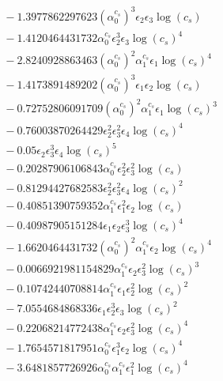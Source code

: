 \documentclass[10pt]{article}
\begin{document}
\begin{align*}
&{}  - 1.3977862297623 \left(\alpha_{0}^{c_s}\right)^{3} \epsilon_{2} \epsilon_{3} \log{\left(c_{s} \right)} \\
&{}  - 1.4120464431732 \alpha_{0}^{c_s} \epsilon_{2}^{3} \epsilon_{3} \log{\left(c_{s} \right)}^{4} \\
&{}  - 2.8240928863463 \left(\alpha_{0}^{c_s}\right)^{2} \alpha_{1}^{c_s} \epsilon_{1} \log{\left(c_{s} \right)}^{4} \\
&{}  - 1.4173891489202 \left(\alpha_{0}^{c_s}\right)^{3} \epsilon_{1} \epsilon_{2} \log{\left(c_{s} \right)} \\
&{}  - 0.72752806091709 \left(\alpha_{0}^{c_s}\right)^{2} \alpha_{1}^{c_s} \epsilon_{1} \log{\left(c_{s} \right)}^{3} \\
&{}  - 0.76003870264429 \epsilon_{2}^{2} \epsilon_{3}^{2} \epsilon_{4} \log{\left(c_{s} \right)}^{4} \\
&{}  - 0.05 \epsilon_{2} \epsilon_{3}^{3} \epsilon_{4} \log{\left(c_{s} \right)}^{5} \\
&{}  - 0.20287906106843 \alpha_{0}^{c_s} \epsilon_{2}^{2} \epsilon_{3}^{2} \log{\left(c_{s} \right)} \\
&{}  - 0.81294427682583 \epsilon_{2}^{2} \epsilon_{3}^{2} \epsilon_{4} \log{\left(c_{s} \right)}^{2} \\
&{}  - 0.40851390759352 \alpha_{1}^{c_s} \epsilon_{1}^{2} \epsilon_{2} \log{\left(c_{s} \right)} \\
&{}  - 0.40987905151284 \epsilon_{1} \epsilon_{2} \epsilon_{3}^{3} \log{\left(c_{s} \right)}^{4} \\
&{}  - 1.6620464431732 \left(\alpha_{0}^{c_s}\right)^{2} \alpha_{1}^{c_s} \epsilon_{2} \log{\left(c_{s} \right)}^{4} \\
&{}  - 0.0066921981154829 \alpha_{1}^{c_s} \epsilon_{2} \epsilon_{3}^{2} \log{\left(c_{s} \right)}^{3} \\
&{}  - 0.10742440708814 \alpha_{1}^{c_s} \epsilon_{1} \epsilon_{2}^{2} \log{\left(c_{s} \right)}^{2} \\
&{}  - 7.0554684868336 \epsilon_{1} \epsilon_{2}^{3} \epsilon_{3} \log{\left(c_{s} \right)}^{2} \\
&{}  - 0.22068214772438 \alpha_{1}^{c_s} \epsilon_{2} \epsilon_{3}^{2} \log{\left(c_{s} \right)}^{4} \\
&{}  - 1.7654571817951 \alpha_{0}^{c_s} \epsilon_{1}^{3} \epsilon_{2} \log{\left(c_{s} \right)}^{4} \\
&{}  - 3.6481857726926 \alpha_{0}^{c_s} \alpha_{1}^{c_s} \epsilon_{1}^{2} \log{\left(c_{s} \right)}^{4} \\

\end{align*}
\end{document}
